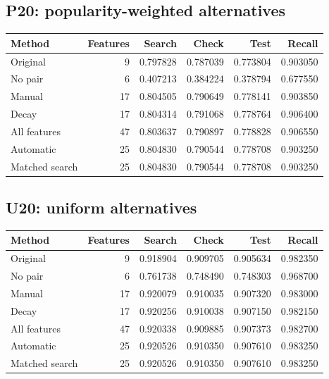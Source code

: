 \subsection*{P20: popularity-weighted alternatives}\begin{center}\small\begin{tabular}{lrrrrr}\toprule Method & Features & Search & Check & Test & Recall\\\midrule
Original & 9 & 0.797828 & 0.787039 & 0.773804 & 0.903050 \\
No pair & 6 & 0.407213 & 0.384224 & 0.378794 & 0.677550 \\
Manual & 17 & 0.804505 & 0.790649 & 0.778141 & 0.903850 \\
Decay & 17 & 0.804314 & 0.791068 & 0.778764 & 0.906400 \\
All features & 47 & 0.803637 & 0.790897 & 0.778828 & 0.906550 \\
Automatic & 25 & 0.804830 & 0.790544 & 0.778708 & 0.903250 \\
Matched search & 25 & 0.804830 & 0.790544 & 0.778708 & 0.903250 \\\bottomrule\end{tabular}\end{center}\subsection*{U20: uniform alternatives}\begin{center}\small\begin{tabular}{lrrrrr}\toprule Method & Features & Search & Check & Test & Recall\\\midrule
Original & 9 & 0.918904 & 0.909705 & 0.905634 & 0.982350 \\
No pair & 6 & 0.761738 & 0.748490 & 0.748303 & 0.968700 \\
Manual & 17 & 0.920079 & 0.910035 & 0.907320 & 0.983000 \\
Decay & 17 & 0.920256 & 0.910038 & 0.907150 & 0.982150 \\
All features & 47 & 0.920338 & 0.909885 & 0.907373 & 0.982700 \\
Automatic & 25 & 0.920526 & 0.910350 & 0.907610 & 0.983250 \\
Matched search & 25 & 0.920526 & 0.910350 & 0.907610 & 0.983250 \\\bottomrule\end{tabular}\end{center}
